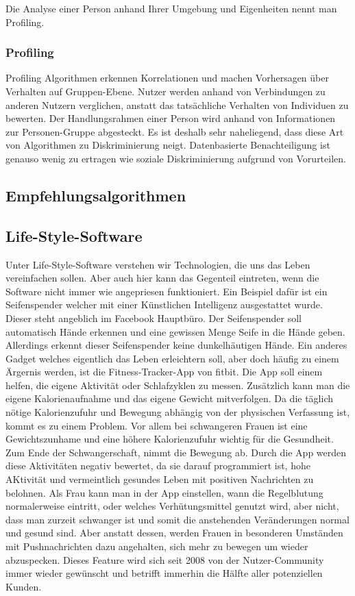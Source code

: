 Die Analyse einer Person anhand Ihrer Umgebung und Eigenheiten nennt man Profiling. 

\subsubsection{Profiling}
Profiling Algorithmen erkennen Korrelationen und machen Vorhersagen über Verhalten auf Gruppen-Ebene. Nutzer werden anhand von Verbindungen zu anderen Nutzern verglichen, anstatt das tatsächliche Verhalten von Individuen zu bewerten. Der Handlungsrahmen einer Person wird anhand von Informationen zur Personen-Gruppe abgesteckt. Es ist deshalb sehr naheliegend, dass diese Art von Algorithmen zu Diskriminierung neigt. Datenbasierte Benachteiligung ist genauso wenig zu ertragen wie soziale Diskriminierung aufgrund von Vorurteilen. 

\subsection{Empfehlungsalgorithmen}


\subsection{Life-Style-Software}
Unter Life-Style-Software verstehen wir Technologien, die uns das Leben vereinfachen sollen. Aber auch hier kann das Gegenteil eintreten, wenn die Software nicht immer wie angepriesen funktioniert. 
Ein Beispiel dafür ist ein Seifenspender welcher mit einer Künstlichen Intelligenz ausgestattet wurde. Dieser steht angeblich im Facebook Hauptbüro. 
Der Seifenspender soll automatisch Hände erkennen und eine gewissen Menge Seife in die Hände geben. Allerdings erkennt dieser Seifenspender keine dunkelhäutigen Hände. \newline 
\label{fitbit}
Ein anderes Gadget welches eigentlich das Leben erleichtern soll, aber doch häufig zu einem Ärgernis werden, ist die Fitness-Tracker-App von fitbit. Die App soll einem helfen, die eigene Aktivität oder Schlafzyklen zu messen. Zusätzlich kann man die eigene Kalorienaufnahme und das eigene Gewicht mitverfolgen. Da die täglich nötige Kalorienzufuhr und Bewegung abhängig von der physischen Verfassung ist, kommt es zu einem Problem. Vor allem bei schwangeren Frauen ist eine Gewichtszunhame und eine höhere Kalorienzufuhr wichtig für die Gesundheit. Zum Ende der Schwangerschaft, nimmt die Bewegung ab. Durch die App werden diese Aktivitäten negativ bewertet, da sie darauf programmiert ist, hohe AKtivität und vermeintlich gesundes Leben mit positiven Nachrichten zu belohnen. 
Als Frau kann man in der App einstellen, wann die Regelblutung normalerweise eintritt, oder welches Verhütungsmittel genutzt wird, aber nicht, dass man zurzeit schwanger ist und somit die anstehenden Veränderungen normal und gesund sind. 
Aber anstatt dessen, werden Frauen in besonderen Umständen mit Pushnachrichten dazu angehalten, sich mehr zu bewegen um wieder abzuspecken. 
Dieses Feature wird sich seit 2008 von der Nutzer-Community immer wieder gewünscht und betrifft immerhin die Hälfte aller potenziellen Kunden. 



